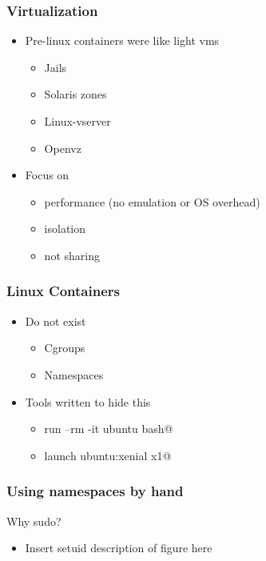 \documentclass{beamer}
\begin{document}
\begin{frame}[fragile]
\frametitle{Virtualization}
	\begin{itemize}
	\item Pre-linux containers were like light vms
		\begin{itemize}
		\item Jails
		\item Solaris zones
		\item Linux-vserver
		\item Openvz
		\end{itemize}
	\item Focus on 
		\begin{itemize}
		\item performance (no emulation or OS overhead)
		\item isolation
		\item not sharing
		\end{itemize}
	\end{itemize}
\end{frame}

\begin{frame}[fragile]
\frametitle{Linux Containers}
	\begin{itemize}
	\item Do not exist
		\begin{itemize}
		\item Cgroups
		\item Namespaces
		\end{itemize}
	\item Tools written to hide this
		\begin{itemize}
		\item \verb@docker run --rm -it ubuntu bash@
		\item \verb@lxc launch ubuntu:xenial x1@
		\end{itemize}
	\end{itemize}
\end{frame}

\begin{frame}
\frametitle{Using namespaces by hand}
\begin{center}
\begin{figure}

\end{figure}
\pause
\vspace{1in}
\item Why sudo?
\end{center}

	\begin{itemize}
	\item Insert setuid description of figure here
	\end{itemize}
\end{frame}
\end{document}
